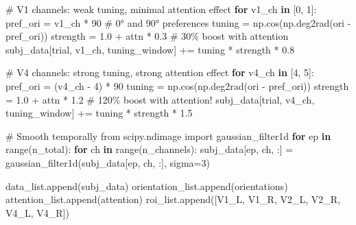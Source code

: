 \documentclass[
  11pt,
  letterpaper,
  oneside,
  openany]{book}
\newenvironment{Shaded}{\begin{snugshade}}{\end{snugshade}}
\newcommand{\BuiltInTok}[1]{\textcolor[rgb]{0.00,0.23,0.31}{#1}}
\newcommand{\CommentTok}[1]{\textcolor[rgb]{0.37,0.37,0.37}{#1}}
\newcommand{\ControlFlowTok}[1]{\textcolor[rgb]{0.00,0.23,0.31}{\textbf{#1}}}
\newcommand{\DecValTok}[1]{\textcolor[rgb]{0.68,0.00,0.00}{#1}}
\newcommand{\FloatTok}[1]{\textcolor[rgb]{0.68,0.00,0.00}{#1}}
\newcommand{\ImportTok}[1]{\textcolor[rgb]{0.00,0.46,0.62}{#1}}
\newcommand{\KeywordTok}[1]{\textcolor[rgb]{0.00,0.23,0.31}{\textbf{#1}}}
\newcommand{\NormalTok}[1]{\textcolor[rgb]{0.00,0.23,0.31}{#1}}
\newcommand{\OperatorTok}[1]{\textcolor[rgb]{0.37,0.37,0.37}{#1}}
\newcommand{\StringTok}[1]{\textcolor[rgb]{0.13,0.47,0.30}{#1}}
\begin{document}
\begin{Shaded}
\begin{Highlighting}[]
            \CommentTok{\# V1 channels: weak tuning, minimal attention effect}
            \ControlFlowTok{for}\NormalTok{ v1\_ch }\KeywordTok{in}\NormalTok{ [}\DecValTok{0}\NormalTok{, }\DecValTok{1}\NormalTok{]:}
\NormalTok{                pref\_ori }\OperatorTok{=}\NormalTok{ v1\_ch }\OperatorTok{*} \DecValTok{90}  \CommentTok{\# 0° and 90° preferences}
\NormalTok{                tuning }\OperatorTok{=}\NormalTok{ np.cos(np.deg2rad(ori }\OperatorTok{{-}}\NormalTok{ pref\_ori))}
\NormalTok{                strength }\OperatorTok{=} \FloatTok{1.0} \OperatorTok{+}\NormalTok{ attn }\OperatorTok{*} \FloatTok{0.3}  \CommentTok{\# 30\% boost with attention}
\NormalTok{                subj\_data[trial, v1\_ch, tuning\_window] }\OperatorTok{+=}\NormalTok{ tuning }\OperatorTok{*}\NormalTok{ strength }\OperatorTok{*} \FloatTok{0.8}
            
            \CommentTok{\# V4 channels: strong tuning, strong attention effect}
            \ControlFlowTok{for}\NormalTok{ v4\_ch }\KeywordTok{in}\NormalTok{ [}\DecValTok{4}\NormalTok{, }\DecValTok{5}\NormalTok{]:}
\NormalTok{                pref\_ori }\OperatorTok{=}\NormalTok{ (v4\_ch }\OperatorTok{{-}} \DecValTok{4}\NormalTok{) }\OperatorTok{*} \DecValTok{90}
\NormalTok{                tuning }\OperatorTok{=}\NormalTok{ np.cos(np.deg2rad(ori }\OperatorTok{{-}}\NormalTok{ pref\_ori))}
\NormalTok{                strength }\OperatorTok{=} \FloatTok{1.0} \OperatorTok{+}\NormalTok{ attn }\OperatorTok{*} \FloatTok{1.2}  \CommentTok{\# 120\% boost with attention!}
\NormalTok{                subj\_data[trial, v4\_ch, tuning\_window] }\OperatorTok{+=}\NormalTok{ tuning }\OperatorTok{*}\NormalTok{ strength }\OperatorTok{*} \FloatTok{1.5}
        
        \CommentTok{\# Smooth temporally}
        \ImportTok{from}\NormalTok{ scipy.ndimage }\ImportTok{import}\NormalTok{ gaussian\_filter1d}
        \ControlFlowTok{for}\NormalTok{ ep }\KeywordTok{in} \BuiltInTok{range}\NormalTok{(n\_total):}
            \ControlFlowTok{for}\NormalTok{ ch }\KeywordTok{in} \BuiltInTok{range}\NormalTok{(n\_channels):}
\NormalTok{                subj\_data[ep, ch, :] }\OperatorTok{=}\NormalTok{ gaussian\_filter1d(subj\_data[ep, ch, :], sigma}\OperatorTok{=}\DecValTok{3}\NormalTok{)}
        
\NormalTok{        data\_list.append(subj\_data)}
\NormalTok{        orientation\_list.append(orientations)}
\NormalTok{        attention\_list.append(attention)}
\NormalTok{        roi\_list.append([}\StringTok{\textquotesingle{}V1\_L\textquotesingle{}}\NormalTok{, }\StringTok{\textquotesingle{}V1\_R\textquotesingle{}}\NormalTok{, }\StringTok{\textquotesingle{}V2\_L\textquotesingle{}}\NormalTok{, }\StringTok{\textquotesingle{}V2\_R\textquotesingle{}}\NormalTok{, }\StringTok{\textquotesingle{}V4\_L\textquotesingle{}}\NormalTok{, }\StringTok{\textquotesingle{}V4\_R\textquotesingle{}}\NormalTok{])}
    

\end{Highlighting}
\end{Shaded}
\end{document}
